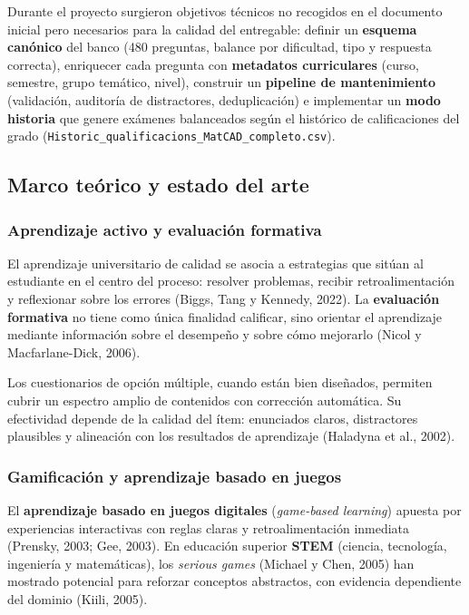 \documentclass[11pt,a4paper]{article}
\begin{document}
Durante el proyecto surgieron objetivos técnicos no recogidos en el documento inicial pero necesarios para la calidad del entregable: definir un \textbf{esquema canónico} del banco (480 preguntas, balance por dificultad, tipo y respuesta correcta), enriquecer cada pregunta con \textbf{metadatos curriculares} (curso, semestre, grupo temático, nivel), construir un \textbf{pipeline de mantenimiento} (validación, auditoría de distractores, deduplicación) e implementar un \textbf{modo historia} que genere exámenes balanceados según el histórico de calificaciones del grado (\texttt{Historic\_qualificacions\_MatCAD\_completo.csv}).

\subsection{Marco teórico y estado del arte}

\subsubsection{Aprendizaje activo y evaluación formativa}

El aprendizaje universitario de calidad se asocia a estrategias que sitúan al estudiante en el centro del proceso: resolver problemas, recibir retroalimentación y reflexionar sobre los errores (Biggs, Tang y Kennedy, 2022). La \textbf{evaluación formativa} no tiene como única finalidad calificar, sino orientar el aprendizaje mediante información sobre el desempeño y sobre cómo mejorarlo (Nicol y Macfarlane-Dick, 2006).

Los cuestionarios de opción múltiple, cuando están bien diseñados, permiten cubrir un espectro amplio de contenidos con corrección automática. Su efectividad depende de la calidad del ítem: enunciados claros, distractores plausibles y alineación con los resultados de aprendizaje (Haladyna et al., 2002).

\subsubsection{Gamificación y aprendizaje basado en juegos}

El \textbf{aprendizaje basado en juegos digitales} (\textit{game-based learning}) apuesta por experiencias interactivas con reglas claras y retroalimentación inmediata (Prensky, 2003; Gee, 2003). En educación superior \textbf{STEM} (ciencia, tecnología, ingeniería y matemáticas), los \textit{serious games} (Michael y Chen, 2005) han mostrado potencial para reforzar conceptos abstractos, con evidencia dependiente del dominio (Kiili, 2005).
\end{document}
